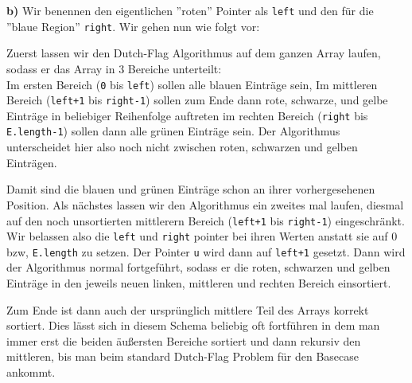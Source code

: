 \documentclass[a4paper,graphics,11pt]{article}
\begin{document}
\textbf{b)}
Wir benennen den eigentlichen ''roten'' Pointer als \texttt{left} und den für die ''blaue Region'' \texttt{right}.
Wir gehen nun wie folgt vor:

Zuerst lassen wir den Dutch-Flag Algorithmus auf dem ganzen Array laufen, sodass er das Array
in 3 Bereiche unterteilt:\\
Im ersten Bereich (\texttt{0} bis \texttt{left})
sollen alle blauen Einträge sein, Im mittleren Bereich (\texttt{left+1} bis \texttt{right-1}) sollen zum Ende dann rote, schwarze, und gelbe Einträge in beliebiger Reihenfolge auftreten im rechten Bereich (\texttt{right}
bis \texttt{E.length-1}) sollen dann alle grünen Einträge sein.
Der Algorithmus unterscheidet hier also noch nicht zwischen roten, schwarzen und gelben Einträgen.

Damit sind die blauen und grünen Einträge schon an ihrer vorhergesehenen Position. Als nächstes lassen
wir den Algorithmus ein zweites mal laufen, diesmal auf den noch unsortierten mittlerern Bereich (\texttt{left+1} bis \texttt{right-1}) eingeschränkt. Wir belassen also die \texttt{left} und \texttt{right} pointer
bei ihren Werten anstatt sie auf 0 bzw, \texttt{E.length} zu setzen. Der Pointer \texttt{u} wird dann
auf \texttt{left+1} gesetzt. Dann wird der Algorithmus normal fortgeführt, sodass er die roten, schwarzen
und gelben Einträge in den jeweils neuen linken, mittleren und rechten Bereich einsortiert.

Zum Ende ist dann auch der ursprünglich mittlere Teil des Arrays korrekt sortiert. Dies lässt sich in diesem
Schema beliebig oft fortführen in dem man immer erst die beiden äußersten Bereiche sortiert und dann rekursiv
den mittleren, bis man beim standard Dutch-Flag Problem für den Basecase ankommt.
\end{document}
